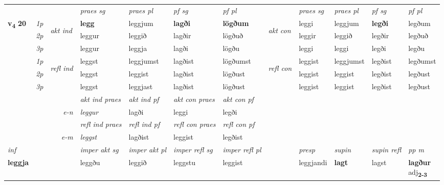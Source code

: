 \begin{longtable}[l]{X>{\footnotesize\itshape}llXXXXlXXXX}
\midrule
 & &   & \textit{praes sg}  & \textit{praes pl}    & \textit{ pf sg} & \textit{pf pl} & & \textit{praes sg}  & \textit{praes pl}    & \textit{pf sg} & \textit{pf pl }  \\ \cmidrule{4-7} \cmidrule{9-12}
 \multirow{2}{*}{{{\textbf{v{\textsubscript{4}}} \Large{\textbf{20}}}}}  & 1p & \multirow{3}{*}{\begin{turn}{90}\textit{akt ind}\end{turn}} & \textbf{legg} & leggjum & \textbf{lagði} & \textbf{lögðum} & \multirow{3}{*}{\begin{turn}{90}\textit{akt con}\end{turn}} &leggi & leggjum & \textbf{legði} & legðum\\*
 & 2p &  &  leggur  & leggið & lagðir & lögðuð & & leggir & leggið & legðir & legðuð \\*
 & 3p &  & leggur & leggja & lagði & lögðu & & leggi & leggi& legði & legðu \\*
\cmidrule{4-7} \cmidrule{9-12}
 & 1p & \multirow{3}{*}{\begin{turn}{90}\textit{refl ind}\end{turn}}  & leggst & leggjumst & lagðist & lögðumst & \multirow{3}{*}{\begin{turn}{90}\textit{refl con}\end{turn}}  &leggist & leggjumst & legðist & legðumst \\*
 & 2p &  & leggst & leggist & lagðist & lögðust & &leggist & leggist & legðist & legðust \\*
 & 3p  & & leggst & leggjast & lagðist & lögðust & & leggist & leggist& legðist & legðust \\*
\cmidrule{4-7} \cmidrule{9-12}

   && &  \textit{akt ind praes} & \textit{akt ind pf} & \textit{akt con praes} & \textit{akt con pf} \\*
\multicolumn{3}{r}{\textit{e-n}} & leggur & lagði & leggi & legði \\*

\cmidrule{4-7}
 & && \textit{refl ind praes} & \textit{refl ind pf} & \textit{refl con praes} & \textit{refl con pf} \\*
\multicolumn{3}{r}{\textit{e-m}}& leggst & lagðist & leggist & legðist \\*

\cmidrule{4-7}
   {\textit{inf}} & &  & \textit{imper akt sg} & \textit{imper akt pl} & \textit{imper refl sg} & \textit{imper refl pl} && \textit{presp} & \textit{supin} & \textit{supin refl} & \textit{pp m} \\*
  {\textbf{leggja}} & && leggðu  & leggið & leggstu & leggist && leggjandi &  \textbf{lagt} & lagst & \specialcell{\textbf{lagður} \\ adj\textbf{\textsubscript{2-3}}} \\*


\end{longtable}
